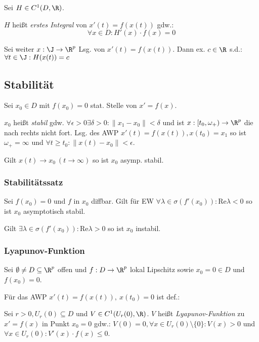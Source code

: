 Sei \(H \in C^1(D,\R)\).

\(H\) heißt \emph{erstes Integral} von \(x'(t)=f(x(t))\) gdw.: \[\forall x \in D : H'(x) \cdot f(x) = 0\]

Sei weiter \(x : \J \to \R^p\) Lsg. von \(x'(t)=f(x(t))\). Dann ex. \(c \in \R\) s.d.: \(\forall t \in \J : H(x(t))=c\)

\subsection*{Stabilität}

Sei \(x_0 \in D\) mit \(f(x_0)=0\) stat. Stelle von \(x'=f(x)\).

\spacing

\(x_0\) heißt \emph{stabil} gdw. \(\forall \epsilon > 0 \exists \delta > 0 : \|x_1-x_0\| < \delta\) und ist \(x : [t_0,\omega_+) \to \R^p\) die nach rechts nicht fort. Lsg. des AWP \(x'(t)=f(x(t)), x(t_0)=x_1\) so ist \(\omega_+ = \infty\) und \(\forall t \geq t_0 : \|x(t)-x_0\| < \epsilon\).

\spacing

Gilt \(x(t) \to x_0 \ (t \to \infty)\) so ist \(x_0\) asymp. stabil.

\subsubsection*{Stabilitätssatz}

Sei \(f(x_0)=0\) und \(f\) in \(x_0\) diffbar. Gilt für EW \(\forall \lambda \in \sigma(f'(x_0)) : \text{Re} \lambda < 0\) so ist \(x_0\) asymptotisch stabil.

\spacing

Gilt \(\exists \lambda \in \sigma(f'(x_0)) : \text{Re} \lambda > 0\) so ist \(x_0\) instabil.

\subsubsection*{Lyapunov-Funktion}

Sei \(\emptyset \neq D \subseteq \R^p\) offen und \(f : D \to \R^p\) lokal Lipschitz sowie \(x_0 = 0 \in D\) und \(f(x_0)=0\).

Für das AWP \(x'(t)=f(x(t)), \ x(t_0)=0\) ist def.:

\spacing

Sei \(r > 0, U_r(0) \subseteq D\) und \(V \in C^1(U_r(0),\R)\). \(V\) heißt \emph{Lyapunov-Funktion} zu \(x'=f(x)\) in Punkt \(x_0=0\) gdw.: \(V(0)=0, \forall x \in U_r(0) \setminus \{0\} : V(x) > 0\) und \(\forall x \in U_r(0) : V'(x) \cdot f(x) \leq 0\).


